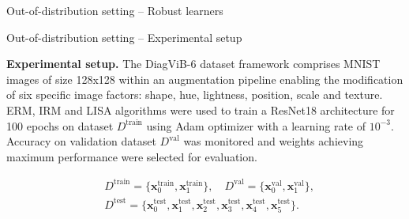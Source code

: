 \begin{frame}{Out-of-distribution setting -- Robust learners}
\end{frame}

\begin{frame}{Out-of-distribution setting -- Experimental setup}

	\vspace{0.2cm}

	\textbf{Experimental setup. }{\small \color{black} The DiagViB-6 dataset
	framework \cite{euligDiagViB6DiagnosticBenchmark2021}
	comprises MNIST images of size 128x128 within an augmentation pipeline enabling
	the modification of six specific image factors: shape, hue, lightness, position,
	scale and texture. ERM, IRM \cite{arjovskyInvariantRiskMinimization2020} and
	LISA \cite{yaoImprovingOutofDistributionRobustness2022} algorithms were used to train a ResNet18 architecture
	for 100 epochs on dataset $D^{\text{train}}$ using Adam \cite{kingmaAdamMethodStochastic2017}
	optimizer with a learning rate of $10^{-3}$. Accuracy on validation dataset $D^{\text{val}}$ was monitored and weights
	achieving maximum performance were selected for evaluation.
	}
		
	$$
    \begin{aligned}
        &D^{\text{train}} = \{\bm{x}_0^{\text{train}}, \bm{x}_1^{\text{train}}\}, \quad D^{\text{val}} = \{\bm{x}_0^{\text{val}}, \bm{x}_1^{\text{val}}\}, \\
        &D^{\text{test}} = \{\bm{x}_0^{\text{test}}, \bm{x}_1^{\text{test}}, \bm{x}_2^{\text{test}}, \bm{x}_3^{\text{test}}, \bm{x}_4^{\text{test}}, \bm{x}_5^{\text{test}}\}.
    \end{aligned}
    $$

	\vspace{0.2cm}


\end{frame}
